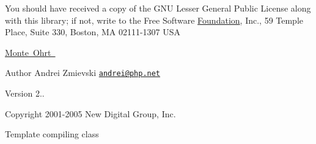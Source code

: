 You should have received a copy of the G\+NU Lesser General Public License along with this library; if not, write to the Free Software \mbox{\hyperlink{namespace_foundation}{Foundation}}, Inc., 59 Temple Place, Suite 330, Boston, MA 02111-\/1307 U\+SA

\mbox{\hyperlink{}{Monte Ohrt }} \begin{DoxyAuthor}{Author}
Andrei Zmievski \href{mailto:andrei@php.net}{\tt andrei@php.\+net} 
\end{DoxyAuthor}
\begin{DoxyVersion}{Version}
2.. 
\end{DoxyVersion}
\begin{DoxyCopyright}{Copyright}
2001-\/2005 New Digital Group, Inc.
\end{DoxyCopyright}
Template compiling class 